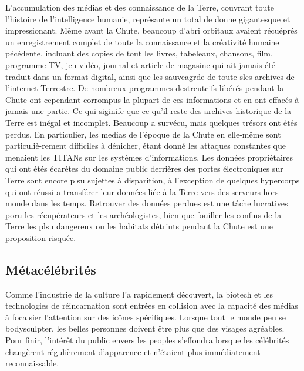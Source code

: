                L'accumulation des médias et des connaissance de la Terre, couvrant toute l'histoire de l'intelligence humanie, représante un total de donne gigantesque et impressionant. Même avant la Chute, beaucoup d'abri orbitaux avaient récuéprés un enregistrement complet de toute la connaissance et la créativité humaine pécédente, incluant des copies de tout les livres, tabeleaux, chansons, film, programme TV, jeu vidéo, journal et article de magasine qui ait jamais été traduit dans un format digital, ainsi que les sauveagrde de toute sles archives de l'internet Terrestre. De nombreux programmes destrcutcifs libérés pendant la Chute ont cependant corrompus la plupart de ces informations et en ont effacés à jamais une partie. Ce qui siginife que ce qu'il reste des archives historique de la Terre est inégal et incomplet. Beaucoup a survécu, mais quelques trésors ont étés perdus. En particulier, les medias de l'époque de la Chute en elle-même sont particuliè-rement difficiles à dénicher, étant donné les attaques constantes que menaient les TITANs sur les systèmes d'informations. Les données propriétaires qui ont étés écarétes du domaine public derrières des portes électroniques sur Terre sont encore plsu sujettes à disparition, à l'exception de quelques hypercorps qui ont réussi a transférer leur données liée à la Terre vers des serveurs hors-monde dans les temps. Retrouver des données perdues est une tâche lucratives poru les récupérateurs et les archéologistes, bien que fouiller les confins de la Terre les plsu dangereux ou les habitats détriuts pendant la Chute est une proposition risquée. 

               \subsection{Métacélébrités} \label{sec:metaceleb} 

               Comme l'industrie de la culture l'a rapidement découvert, la biotech et les technologies de réincarnation sont entrées en collision avec la capacité des médias à focalsier l'attention sur des icônes spécifiques. Lorsque tout le monde peu se bodysculpter, les belles personnes doivent être plus que des visages agréables. Pour finir, l'intérêt du public envers les peoples s'effondra lorsque les célébrités changèrent régulièrement d'apparence et n'étaient plus immédiatement reconnaissable. 

